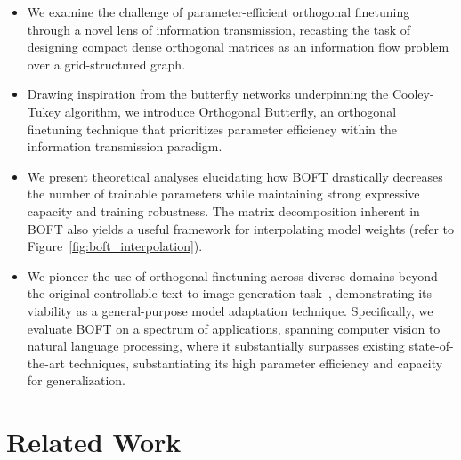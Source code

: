 \begin{itemize}[leftmargin=*,nosep]
    \item We examine the challenge of parameter-efficient orthogonal finetuning through a novel lens of information transmission, recasting the task of designing compact dense orthogonal matrices as an information flow problem over a grid-structured graph.
    \item Drawing inspiration from the butterfly networks underpinning the Cooley-Tukey algorithm, we introduce Orthogonal Butterfly, an orthogonal finetuning technique that prioritizes parameter efficiency within the information transmission paradigm.
    \item We present theoretical analyses elucidating how BOFT drastically decreases the number of trainable parameters while maintaining strong expressive capacity and training robustness. The matrix decomposition inherent in BOFT also yields a useful framework for interpolating model weights (refer to Figure~\ref{fig:boft_interpolation}).
    \item We pioneer the use of orthogonal finetuning across diverse domains beyond the original controllable text-to-image generation task~\cite{qiu2023controlling}, demonstrating its viability as a general-purpose model adaptation technique. Specifically, we evaluate BOFT on a spectrum of applications, spanning computer vision to natural language processing, where it substantially surpasses existing state-of-the-art techniques, substantiating its high parameter efficiency and capacity for generalization.
\end{itemize}

\section{Related Work}

